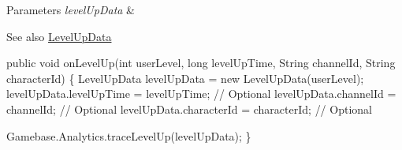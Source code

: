 \begin{DoxyParams}{Parameters}
{\em level\+Up\+Data} & \\
\hline
\end{DoxyParams}
\begin{DoxySeeAlso}{See also}
\hyperlink{}{Level\+Up\+Data} 
\begin{DoxyCode}
\textcolor{keyword}{public} \textcolor{keywordtype}{void} onLevelUp(\textcolor{keywordtype}{int} userLevel, \textcolor{keywordtype}{long} levelUpTime, String channelId, String characterId) \{
    LevelUpData levelUpData = \textcolor{keyword}{new} LevelUpData(userLevel);
    levelUpData.levelUpTime = levelUpTime; \textcolor{comment}{// Optional}
    levelUpData.channelId = channelId; \textcolor{comment}{// Optional}
    levelUpData.characterId = characterId; \textcolor{comment}{// Optional}

    Gamebase.Analytics.traceLevelUp(levelUpData);
\}
\end{DoxyCode}
 
\end{DoxySeeAlso}
